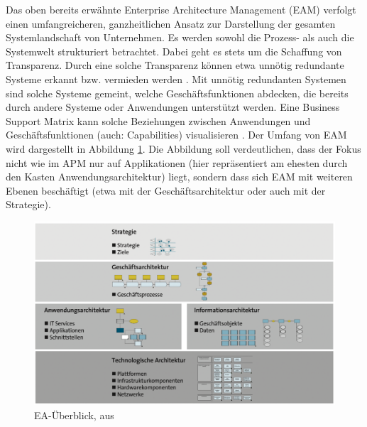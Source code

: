 Das oben bereits erwähnte Enterprise Architecture Management (EAM) verfolgt einen umfangreicheren, ganzheitlichen Ansatz zur Darstellung der gesamten Systemlandschaft von Unternehmen. Es werden sowohl die Prozess- als auch die Systemwelt strukturiert betrachtet. Dabei geht es stets um die Schaffung von Transparenz. Durch eine solche Transparenz können etwa unnötig redundante Systeme erkannt bzw. vermieden werden \cite[S. 7-10]{Bitkom}. Mit unnötig redundanten Systemen sind solche Systeme gemeint, welche Geschäftsfunktionen abdecken, die bereits durch andere Systeme oder Anwendungen unterstützt werden. Eine Business Support Matrix kann solche Beziehungen zwischen Anwendungen und Geschäftsfunktionen (auch: Capabilities) visualisieren \cite{jung1}. 
Der Umfang von EAM wird dargestellt in Abbildung \ref{Abbildung:ea}. Die Abbildung soll verdeutlichen, dass der Fokus nicht wie im APM nur auf Applikationen (hier repräsentiert am ehesten durch den Kasten Anwendungsarchitektur) liegt, sondern dass sich EAM mit weiteren Ebenen beschäftigt (etwa mit der Geschäftsarchitektur oder auch mit der Strategie).
 
\begin{figure}[h]
\centering
\includegraphics[scale=0.9]{content/pics/Picture_8.png}
\caption{EA-Überblick, aus \cite[S. 13]{Bitkom}}
\label{Abbildung:ea}
\end{figure}

